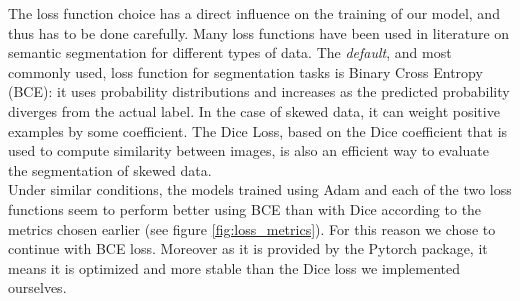 \documentclass[10pt,conference,compsocconf]{IEEEtran}
\begin{document}
The loss function choice has a direct influence on the training of our model, and thus has to be done carefully. Many loss functions have been used in literature on semantic segmentation \cite{loss_functions} for different types of data. The \emph{default}, and most commonly used, loss function for segmentation tasks is Binary Cross Entropy (BCE): it uses probability distributions and increases as the predicted probability diverges from the actual label. In the case of skewed data, it can weight positive examples by some coefficient. The Dice Loss, based on the Dice coefficient that is used to compute similarity between images, is also an efficient way to evaluate the segmentation of skewed data. \\

Under similar conditions, the models trained using Adam and each of the two loss functions seem to perform better using BCE than with Dice according to the metrics chosen earlier (see figure \ref{fig:loss_metrics}). For this reason we chose to continue with BCE loss. Moreover as it is provided by the Pytorch package, it means it is optimized and more stable than the Dice loss we implemented ourselves.  
\end{document}
